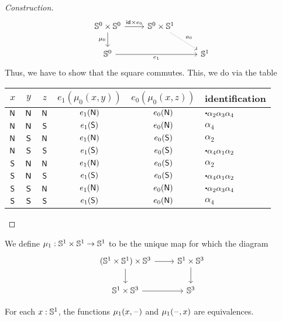 \documentclass{article}
\begin{document}
\begin{proof}[Construction]
\begin{equation*}
\begin{tikzcd}
\Sn^0\times\Sn^0 \arrow[d,swap,"\mu_0"] \arrow[r,"\idfunc\times e_0"] & \Sn^0\times\Sn^1 \arrow[dr,densely dotted,"a_0"] \\
\Sn^0 \arrow[rr,swap,"e_1"] & & \Sn^1
\end{tikzcd}
\end{equation*}
Thus, we have to show that the square commutes. This, we do via the table
\begin{center}
\begin{tabular}{ccc|cc|l}
$x$ & $y$ & $z$ & $e_1(\mu_0(x,y))$ & $e_0(\mu_0(x,z))$ & identification \\
\midrule
$\mathsf{N}$ & $\mathsf{N}$ & $\mathsf{N}$ & $e_1(\mathsf{N})$ & $e_0(\mathsf{N})$ & $\ct{\alpha_2}{\alpha_3}{\alpha_4}$ \\
$\mathsf{N}$ & $\mathsf{N}$ & $\mathsf{S}$ & $e_1(\mathsf{S})$ & $e_0(\mathsf{N})$ & $\alpha_4$ \\
$\mathsf{N}$ & $\mathsf{S}$ & $\mathsf{N}$ & $e_1(\mathsf{N})$ & $e_0(\mathsf{S})$ & $\alpha_2$ \\
$\mathsf{N}$ & $\mathsf{S}$ & $\mathsf{S}$ & $e_1(\mathsf{S})$ & $e_0(\mathsf{S})$ & $\ct{\alpha_4}{\alpha_1}{\alpha_2}$ \\
$\mathsf{S}$ & $\mathsf{N}$ & $\mathsf{N}$ & $e_1(\mathsf{N})$ & $e_0(\mathsf{S})$ & $\alpha_2$ \\
$\mathsf{S}$ & $\mathsf{N}$ & $\mathsf{S}$ & $e_1(\mathsf{S})$ & $e_0(\mathsf{S})$ & $\ct{\alpha_4}{\alpha_1}{\alpha_2}$ \\
$\mathsf{S}$ & $\mathsf{S}$ & $\mathsf{N}$ & $e_1(\mathsf{N})$ & $e_0(\mathsf{N})$ & $\ct{\alpha_2}{\alpha_3}{\alpha_4}$ \\
$\mathsf{S}$ & $\mathsf{S}$ & $\mathsf{S}$ & $e_1(\mathsf{S})$ & $e_0(\mathsf{N})$ & $\alpha_4$
\end{tabular}
\end{center}
\end{proof}

\begin{defn}
We define $\mu_1:\mathbb{S}^1\times\mathbb{S}^1\to\mathbb{S}^1$ to be the unique map for which the
diagram
\begin{equation*}
\begin{tikzcd}
(\Sn^1\times\Sn^1)\times\Sn^3 \arrow[r] \arrow[d] & \Sn^1\times\Sn^3 \arrow[d] \\
\Sn^1\times\Sn^3 \arrow[r] & \Sn^3
\end{tikzcd}
\end{equation*}
\end{defn}

\begin{thm}
For each $x:\mathbb{S}^1$, the functions $\mu_1(x,\mathord{\hspace{1pt}\text{--}\hspace{1pt}})$ and $\mu_1(\mathord{\hspace{1pt}\text{--}\hspace{1pt}},x)$ are
equivalences. 
\end{thm}
\end{document}
